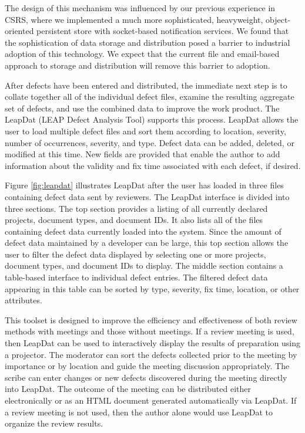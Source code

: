 The design of this mechanism was influenced by our previous experience in
CSRS, where we implemented a much more sophisticated, heavyweight,
object-oriented persistent store with socket-based notification services.
We found that the sophistication of data storage and distribution posed a
barrier to industrial adoption of this technology. We expect that 
the current  file and email-based approach to storage and
distribution will remove this barrier to adoption.



After defects have been entered and distributed, the immediate next step is
to collate together all of the individual defect files, examine the
resulting aggregate set of defects, and use the combined data to improve
the work product.  The LeapDat (LEAP Defect Analysis Tool) supports this
process.  LeapDat allows the user to load multiple defect files and sort
them according to location, severity, number of occurrences, severity, and
type.  Defect data can be added, deleted, or modified at this time. New
fields are provided that enable the author to add information about the
validity and fix time associated with each defect, if desired.  

Figure \ref{fig:leapdat} illustrates LeapDat after the user has loaded in
three files containing defect data sent by reviewers.  The LeapDat
interface is divided into three sections. The top section provides a
listing of all currently declared projects, document types, and document
IDs. It also lists all of the files containing defect data currently loaded
into the system. Since the amount of defect data maintained by a developer
can be large, this top section allows the user to filter the defect data
displayed by selecting one or more projects, document types, and document
IDs to display.  The middle section contains a table-based interface to
individual defect entries. The filtered defect data appearing in this table
can be sorted by type, severity, fix time, location, or other attributes.

This toolset is designed to improve the efficiency and effectiveness
of both review methods with meetings and those without meetings. If a
review meeting is used, then LeapDat can be used to interactively display
the results of preparation using a projector. The moderator can sort the 
defects collected prior to the meeting by importance or by location and
guide the meeting discussion appropriately.  The scribe can enter changes
or new defects discovered during the meeting directly into LeapDat. The 
outcome of the meeting can be distributed either electronically or as an
HTML document generated automatically via LeapDat. If a review meeting is
not used, then the author alone would use LeapDat to organize the review
results. 

